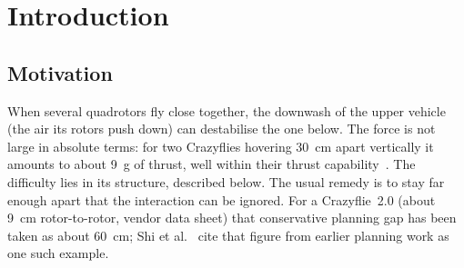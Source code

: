 %
%
%

\chapter{Introduction}
\label{ch:intro}

\section{Motivation}
\label{sec:intro-motivation}

When several quadrotors fly close together, the downwash of the upper vehicle (the air its rotors push down) can destabilise the
one below.
The force is not large in absolute terms: for two Crazyflies hovering \SI{30}{\centi\metre} apart
vertically it amounts to about \SI{9}{\gram} of thrust, well within their thrust
capability~\cite{shi2020neuralswarm}. The difficulty lies in its structure, described below. The usual remedy is to stay far enough apart that the interaction can be ignored. For a
Crazyflie~2.0 (about \SI{9}{\centi\metre} rotor-to-rotor, vendor data sheet) that conservative planning gap has been taken
as about \SI{60}{\centi\metre}; Shi et al.~\cite{shi2020neuralswarm} cite that figure from earlier
planning work as one such example.

